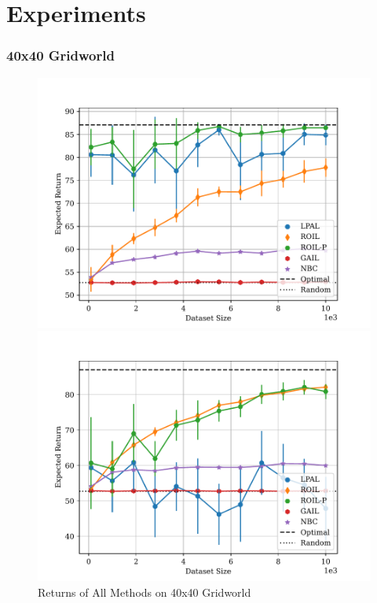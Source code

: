 \documentclass{beamer}
\begin{document}
\section*{Experiments}

\begin{frame}
\frametitle{40x40 Gridworld}

\begin{figure}
  \begin{center}
  \begin{minipage}{0.45\linewidth}
    \centering
    \includegraphics[width=\linewidth]{plots/returns/40x40_gridworld_on_policy_returns.pdf}
  \end{minipage}
  \hspace{0.05\linewidth}
  \begin{minipage}{0.45\linewidth}
    \centering
    \includegraphics[width=\linewidth]{plots/returns/40x40_gridworld_off_policy_returns.pdf}
  \end{minipage}
  \end{center}
\caption{Returns of All Methods on 40x40 Gridworld}
\end{figure}

\end{frame}
\end{document}
